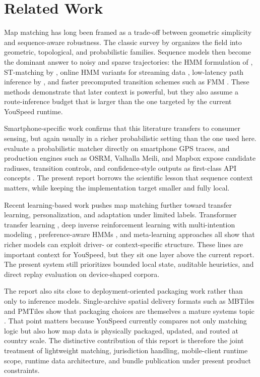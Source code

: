 \documentclass{article}
\begin{document}
\section{Related Work}
Map matching has long been framed as a trade-off between geometric simplicity and sequence-aware robustness. The classic survey by \citet{quddus2007} organizes the field into geometric, topological, and probabilistic families. Sequence models then become the dominant answer to noisy and sparse trajectories: the HMM formulation of \citet{newson2009}, ST-matching by \citet{lou2009}, online HMM variants for streaming data \citep{goh2012,he2013}, low-latency path inference by \citet{hunter2014}, and faster precomputed transition schemes such as FMM \citep{yang2018fmm}. These methods demonstrate that later context is powerful, but they also assume a route-inference budget that is larger than the one targeted by the current YouSpeed runtime.

Smartphone-specific work confirms that this literature transfers to consumer sensing, but again usually in a richer probabilistic setting than the one used here. \citet{bierlaire2013smartphone} evaluate a probabilistic matcher directly on smartphone GPS traces, and production engines such as OSRM, Valhalla Meili, and Mapbox expose candidate radiuses, transition controls, and confidence-style outputs as first-class API concepts \citep{osrm_match_service,valhalla_meili,mapbox_map_matching_api}. The present report borrows the scientific lesson that sequence context matters, while keeping the implementation target smaller and fully local.

Recent learning-based work pushes map matching further toward transfer learning, personalization, and adaptation under limited labels. Transformer transfer learning \citep{jin2022transformer}, deep inverse reinforcement learning with multi-intention modeling \citep{safarzadeh2024midirl}, preference-aware HMMs \citep{zhang2025pphmm}, and meta-learning approaches \citep{meng2026mpm} all show that richer models can exploit driver- or context-specific structure. These lines are important context for YouSpeed, but they sit one layer above the current report. The present system still prioritizes bounded local state, auditable heuristics, and direct replay evaluation on device-shaped corpora.

The report also sits close to deployment-oriented packaging work rather than only to inference models. Single-archive spatial delivery formats such as MBTiles and PMTiles show that packaging choices are themselves a mature systems topic \citep{mbtiles_spec,pmtiles_docs}. That point matters because YouSpeed currently compares not only matching logic but also how map data is physically packaged, updated, and routed at country scale. The distinctive contribution of this report is therefore the joint treatment of lightweight matching, jurisdiction handling, mobile-client runtime scope, runtime data architecture, and bundle publication under present product constraints.
\end{document}
